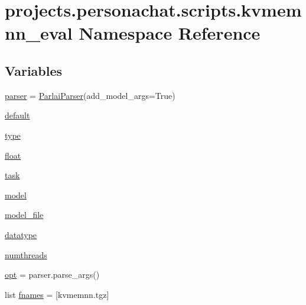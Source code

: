 \hypertarget{namespaceprojects_1_1personachat_1_1scripts_1_1kvmemnn__eval}{}\section{projects.\+personachat.\+scripts.\+kvmemnn\+\_\+eval Namespace Reference}
\label{namespaceprojects_1_1personachat_1_1scripts_1_1kvmemnn__eval}
\subsection*{Variables}
\begin{DoxyCompactItemize}
\item 
\hyperlink{namespaceprojects_1_1personachat_1_1scripts_1_1kvmemnn__eval_a63fe5b651c3e9e6afbb51c841fc6f1df}{parser} = \hyperlink{classparlai_1_1core_1_1params_1_1ParlaiParser}{Parlai\+Parser}(add\+\_\+model\+\_\+args=True)
\item 
\hyperlink{namespaceprojects_1_1personachat_1_1scripts_1_1kvmemnn__eval_a00f2399fa8227f1aa1a5ed312f25d5c8}{default}
\item 
\hyperlink{namespaceprojects_1_1personachat_1_1scripts_1_1kvmemnn__eval_a52b955236005ddbf4e85e792147db317}{type}
\item 
\hyperlink{namespaceprojects_1_1personachat_1_1scripts_1_1kvmemnn__eval_a6350a0ff855257ed96d21e4d106fbd73}{float}
\item 
\hyperlink{namespaceprojects_1_1personachat_1_1scripts_1_1kvmemnn__eval_a6e5f8bf0441a5997080dee205e000dc2}{task}
\item 
\hyperlink{namespaceprojects_1_1personachat_1_1scripts_1_1kvmemnn__eval_a039499ae0f4b08487772005a13cefd6e}{model}
\item 
\hyperlink{namespaceprojects_1_1personachat_1_1scripts_1_1kvmemnn__eval_a82dc6e9e0e060830201c7fb644688813}{model\+\_\+file}
\item 
\hyperlink{namespaceprojects_1_1personachat_1_1scripts_1_1kvmemnn__eval_aa3e724729da04451069b3e08c518e90e}{datatype}
\item 
\hyperlink{namespaceprojects_1_1personachat_1_1scripts_1_1kvmemnn__eval_a80fb6607eb5d3215816b9bc306906fd5}{numthreads}
\item 
\hyperlink{namespaceprojects_1_1personachat_1_1scripts_1_1kvmemnn__eval_a326a8f5dac63a35017b573e99d1653bc}{opt} = parser.\+parse\+\_\+args()
\item 
list \hyperlink{namespaceprojects_1_1personachat_1_1scripts_1_1kvmemnn__eval_a6709664a2262d8e60c137ab34988a05e}{fnames} = \mbox{[}\textquotesingle{}kvmemnn.\+tgz\textquotesingle{}\mbox{]}
\end{DoxyCompactItemize}



